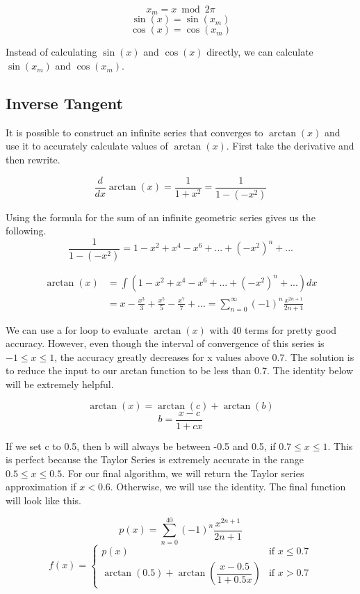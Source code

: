 \documentclass[12pt, letterpaper]{article}
\begin{document}
\[ x_m = x \bmod{2\pi} \]
\[ \sin(x) = \sin(x_m) \]
\[ \cos(x) = \cos(x_m) \]

Instead of calculating $\sin(x)$ and $\cos(x)$ directly, we can calculate $\sin(x_m)$ and $\cos(x_m)$.

\subsection{Inverse Tangent}
It is possible to construct an infinite series that converges to $\arctan(x)$ and use it to accurately calculate values of $\arctan(x)$. First take the derivative and then rewrite.

\[ \frac{d}{dx} \arctan(x) = \frac{1}{1 + x^2} = \frac{1}{1 - (-x^2)}\]

Using the formula for the sum of an infinite geometric series gives us the following.
\[ \frac{1}{1 - (-x^2)} = 1 - x^2 + x^4 - x^6 + ... + (-x^2)^n + ... \]

\begin{align*}
  \arctan(x) &= \int \left(1 - x^2 + x^4 - x^6 + ... + (-x^2)^n + ...\right)dx \\ 
  &= x - \frac{x^3}{3} + \frac{x^5}{5} - \frac{x^7}{7} + ... = \sum_{n=0}^{\infty}\left(-1\right)^{n}\frac{x^{2n+1}}{2n+1}
\end{align*}

We can use a for loop to evaluate $\arctan(x)$ with 40 terms for pretty good accuracy. However, even though the interval of convergence of this series is $-1 \leq x \leq 1$, the accuracy greatly decreases for x values above 0.7. The solution is to reduce the input to our arctan function to be less than 0.7. The identity below will be extremely helpful.

\[ \arctan(x) = \arctan(c) + \arctan\left(b\right) \]
\[ b = \frac{x-c}{1+cx} \]

If we set c to 0.5, then b will always be between -0.5 and 0.5, if $0.7 \leq x \leq 1$. This is perfect because the Taylor Series is extremely accurate in the range $0.5 \leq x \leq 0.5$. For our final algorithm, we will return the Taylor series approximation if $x < 0.6$. Otherwise, we will use the identity. The final function will look like this.

\[ p(x) = \sum_{n=0}^{40}\left(-1\right)^{n}\frac{x^{2n+1}}{2n+1} \]
\[ f(x) = \begin{cases}
  p(x) & \text{if } x \leq 0.7 \\
  \arctan(0.5) + \arctan\left(\dfrac{x-0.5}{1+0.5x}\right) & \text{if } x > 0.7
\end{cases} \]
\end{document}
